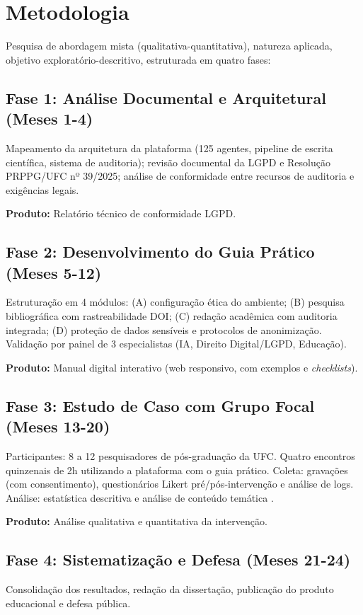 \documentclass[
    12pt,
    openany,
    oneside,
    a4paper,
    brazilian
]{abntex2}
\begin{document}
\section{Metodologia}

Pesquisa de abordagem mista (qualitativa-quantitativa), natureza aplicada, objetivo exploratório-descritivo, estruturada em quatro fases:

\subsection{Fase 1: Análise Documental e Arquitetural (Meses 1-4)}
Mapeamento da arquitetura da plataforma (125 agentes, pipeline de escrita científica, sistema de auditoria); revisão documental da LGPD e Resolução PRPPG/UFC nº 39/2025; análise de conformidade entre recursos de auditoria e exigências legais.

\noindent\textbf{Produto:} Relatório técnico de conformidade LGPD.

\subsection{Fase 2: Desenvolvimento do Guia Prático (Meses 5-12)}
Estruturação em 4 módulos: (A) configuração ética do ambiente; (B) pesquisa bibliográfica com rastreabilidade DOI; (C) redação acadêmica com auditoria integrada; (D) proteção de dados sensíveis e protocolos de anonimização. Validação por painel de 3 especialistas (IA, Direito Digital/LGPD, Educação).

\noindent\textbf{Produto:} Manual digital interativo (web responsivo, com exemplos e \textit{checklists}).

\subsection{Fase 3: Estudo de Caso com Grupo Focal (Meses 13-20)}
Participantes: 8 a 12 pesquisadores de pós-graduação da UFC. Quatro encontros quinzenais de 2h utilizando a plataforma com o guia prático. Coleta: gravações (com consentimento), questionários Likert pré/pós-intervenção e análise de logs. Análise: estatística descritiva e análise de conteúdo temática \cite{bardin2016}.

\noindent\textbf{Produto:} Análise qualitativa e quantitativa da intervenção.

\subsection{Fase 4: Sistematização e Defesa (Meses 21-24)}
Consolidação dos resultados, redação da dissertação, publicação do produto educacional e defesa pública.
\end{document}
